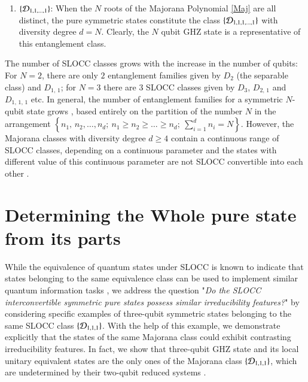 {\begin{enumerate}
Dicke states $\left\vert \frac{N}{2}, k-\frac{N}{2}\right\rangle$ are the representative states of the entanglement class $\{{\cal D}_{N-k,k}\}$ with two independent spinors  and clearly, they are all inequivalent under  SLOCC (as the degeneracy classification  is different for each $k=1,2, \ldots [N/2]$).

\item $\{{\cal D}_{1,1,\ldots, 1}\}$:  When the $N$ roots of the Majorana Polynomial \eqref{Maj} are all distinct, the pure symmetric states constitute  the class $\{ {\cal D}_{1,1,1,\ldots, 1}\}$ with diversity degree  $d=N$. Clearly, the $N$ qubit GHZ state is a representative of this entanglement class. 
\end{enumerate}
The number of SLOCC classes  grows  with the increase in the number of qubits: For $N=2$, there are only $2$ entanglement families given by 
$D_{2}$ (the separable class) and $D_{1,\,1}$; for $N=3$ there are $3$ SLOCC classes given by $D_{3}$, $D_{2,\,1}$ and $D_{1,\,1,\,1} $ etc.  In general, the number of entanglement families for a symmetric $N$-qubit state grows \cite{solano}, based entirely on the partition of the number $N$ in the arrangement $\left\{n_1,\,n_2,\ldots ,n_d;\ n_1\geq n_2\geq\ldots\geq n_d;\   \sum_{i=1}^{d} n_i=N\right\}$. However, the Majorana classes  with diversity degree $d\geq 4$ contain a continuous range of SLOCC classes, depending on a continuous  parameter and the states with different value of this continuous  parameter  are not SLOCC convertible into each other \cite{solano}. 

  
\section{Determining the Whole pure state from its parts}\label{chap29-eqIV} 

While the equivalence of quantum states under SLOCC is known to indicate that states belonging to the same equivalence class can be used to implement similar quantum information tasks \cite{Dur}, we address the question "{\emph{Do the {\rm SLOCC} interconvertible symmetric pure states possess similar irreducibility features?}}" by considering specific examples of three-qubit symmetric states belonging to the same SLOCC class $\{{\cal D}_{1,1,1}\}$.  With the help of this example, we demonstrate explicitly that the states of the same Majorana class could exhibit contrasting irreducibility features. In fact, we show that three-qubit GHZ state and its local unitary equivalent states are the only ones of the Majorana class $\{{\cal D}_{1,1,1}\}$,  which are undetermined by their two-qubit reduced systems \cite{SP1,Walck,Walck2}. 

}
